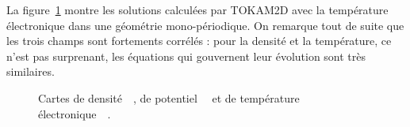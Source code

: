\begin{refsection}
La figure~\ref{2-CartesWithTe} montre les solutions calculées par TOKAM2D avec
la température électronique dans une géométrie mono-périodique. On remarque tout
de suite que les trois champs sont fortements corrélés : pour la densité et
la température, ce n'est pas surprenant, les équations qui gouvernent leur
évolution sont très similaires. 
\begin{figure}[!htbp]
    \centering
    \caption{Cartes de densité~~, de
    potentiel~~ et de température 
    électronique~~.}
    \label{2-CartesWithTe}
	\end{figure}
	

\end{refsection}
